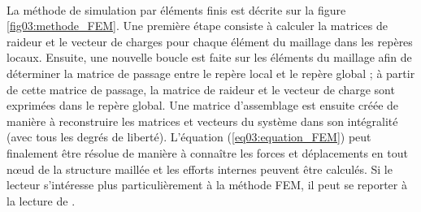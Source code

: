 			\\La méthode de simulation par éléments finis est décrite sur la figure \ref{fig03:methode_FEM}. Une première étape consiste à calculer la matrices de raideur et le vecteur de charges pour chaque élément du maillage dans les repères locaux. Ensuite, une nouvelle boucle est faite sur les éléments du maillage afin de déterminer la matrice de passage entre le repère local et le repère global ; à partir de cette matrice de passage, la matrice de raideur et le vecteur de charge sont exprimées dans le repère global. Une matrice d'assemblage est ensuite créée de manière à reconstruire les matrices et vecteurs du système dans son intégralité (avec tous les degrés de liberté). L'équation (\ref{eq03:equation_FEM}) peut finalement être résolue de manière à connaître les forces et déplacements en tout n\oe{}ud de la structure maillée et les efforts internes peuvent être calculés. Si le lecteur s'intéresse plus particulièrement à la méthode FEM, il peut se reporter à la lecture de \citet{cazenave_methode_2013}.
